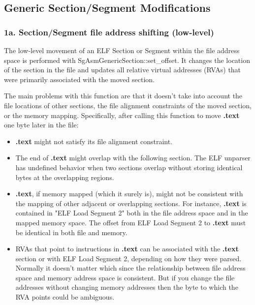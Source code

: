 \subsection{Generic Section/Segment Modifications}

\subsubsection{1a. Section/Segment file address shifting (low-level)}

   The low-level movement of an ELF Section or Segment within the file address space is performed with
   SgAsmGenericSection::set\_offset.  It changes the location of the section in the file and updates all relative virtual
   addresses (RVAs) that were primarily associated with the moved section.

   The main problems with this function are that it doesn't take into account the file locations of other sections, the file
   alignment constraints of the moved section, or the memory mapping. Specifically, after calling this function to move {\bf.text}
   one byte later in the file:
\begin{itemize}
   \item {\bf.text} might not satisfy its file alignment constraint.

   \item The end of {\bf.text} might overlap with the following section. The ELF unparser has undefined behavior when two sections
     overlap without storing identical bytes at the overlapping regions.

   \item {\bf.text}, if memory mapped (which it surely is), might not be consistent with the mapping of other adjacent or overlapping
     sections. For instance, {\bf.text} is contained in "ELF Load Segment 2" both in the file address space and in the mapped
     memory space. The offset from ELF Load Segment 2 to {\bf.text} must be identical in both file and memory.

   \item RVAs that point to instructions in {\bf.text} can be associated with the {\bf.text} section or with ELF Load Segment 2,
     depending on how they were parsed. Normally it doesn't matter which since the relationship between file address space and
     memory address space is consistent. But if you change the file addresses without changing memory addresses then the byte
     to which the RVA points could be ambiguous.
\end{itemize}


